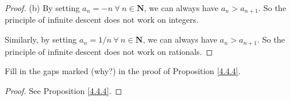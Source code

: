 \begin{proof}{(b)}
    By setting \(a_n = -n \ \forall\ n \in \mathbf{N}\), we can always have \(a_n > a_{n + 1}\).
    So the principle of infinite descent does not work on integers.

    Similarly, by setting \(a_n = 1 / n \ \forall\ n \in \mathbf{N}\), we can always have \(a_n > a_{n + 1}\).
    So the principle of infinite descent does not work on rationals.
\end{proof}

\begin{exercise}\label{ex 4.4.3}
    Fill in the gaps marked (why?) in the proof of Proposition \ref{4.4.4}.
\end{exercise}

\begin{proof}
    See Proposition \ref{4.4.4}.
\end{proof}